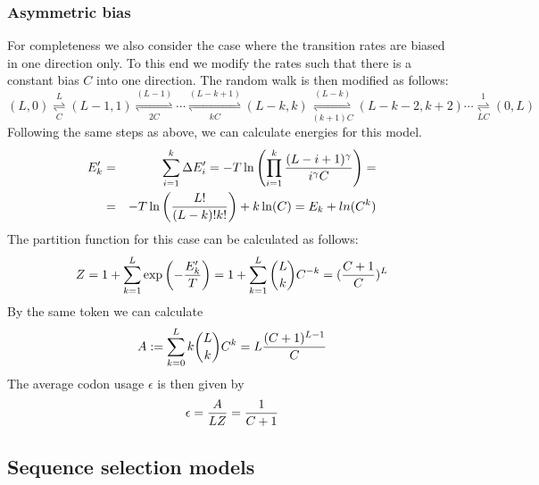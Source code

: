 \documentclass[a4paper,10pt]{paper}%
\begin{document}
\subsubsection{Asymmetric bias}
For completeness we also consider the case where the transition rates are biased in one direction only.  To this end we  modify the rates such that there is a constant bias $C$ into one direction. The random walk is then modified as follows:
%
% 
\begin{equation}
(L,0) \overset{L}{\underset{C}{\rightleftharpoons}} (L-1,1) \overset{(L-1)}{\underset{2 C}{\rightleftharpoons}} \cdots 
  \overset{(L-k+1)}{\underset{kC}{\rightleftharpoons}} (L-k,k) \overset{(L-k)}{\underset{(k+1)C}{\rightleftharpoons}}  (L-k-2,k+2)\cdots  \overset{1}{\underset{LC}{\rightleftharpoons}}  (0,L)
\end{equation}
%
%
Following the same steps as above, we can calculate energies for this model.  
%
%
\begin{eqnarray}
 E'_k &=& \sum_{i=1}^k \Delta  E'_i= -T\ln\left( \prod_{i=1}^k {(L-i+1)^\gamma \over i^\gamma C}  \right)=\nonumber\\
&=& - T\ln\left(  L!\over (L-k)! k!\right) + k\ln(C)
=  E_k + ln(C^k)
\end{eqnarray}
%
%
The partition function for this case can be calculated as follows:
%
% 
\begin{equation}
Z=1+\sum_{k=1}^L \exp\left(-{E'_k\over T}\right) =  1+\sum_{k=1}^L \binom{L}{k} C^{-k} = ({C+1\over C})^L 
\end{equation}
%
% 
By the same token we can calculate 
%
% 
\begin{equation}
A:= \sum_{k=0}^L k\binom{L}{k} C^k = L{(C+1)^{L-1}\over C}
\end{equation}
%
% 
The average codon usage $\epsilon$ is then given by
%
% 
\begin{equation}
\epsilon = {A\over LZ} = {1\over C +1}
\end{equation}
%
%




\subsection{Sequence selection models}
\end{document}
